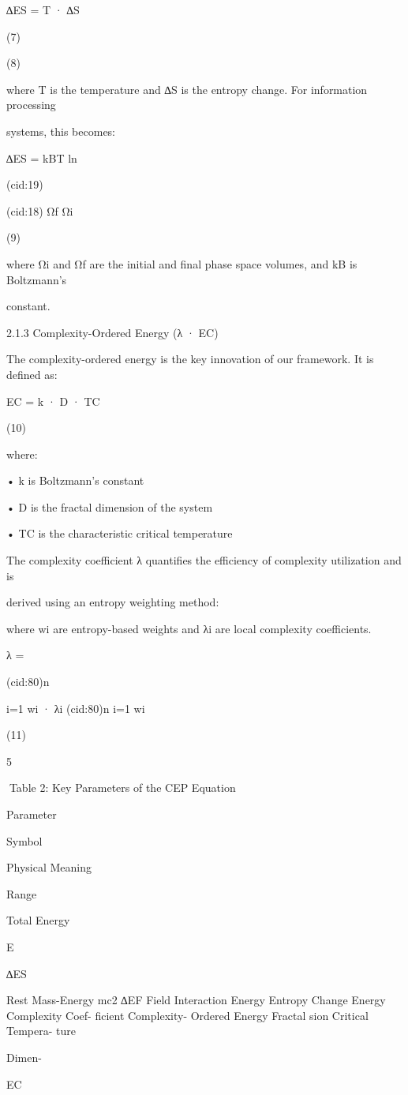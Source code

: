 ∆ES = T · ∆S

(7)

(8)

where T is the temperature and ∆S is the entropy change. For information processing

systems, this becomes:

∆ES = kBT ln

(cid:19)

(cid:18) Ωf
Ωi

(9)

where Ωi and Ωf are the initial and final phase space volumes, and kB is Boltzmann’s

constant.

2.1.3 Complexity-Ordered Energy (λ · EC)

The complexity-ordered energy is the key innovation of our framework. It is defined as:

EC = k · D · TC

(10)

where:

• k is Boltzmann’s constant

• D is the fractal dimension of the system

• TC is the characteristic critical temperature

The complexity coefficient λ quantifies the efficiency of complexity utilization and is

derived using an entropy weighting method:

where wi are entropy-based weights and λi are local complexity coefficients.

λ =

(cid:80)n

i=1 wi · λi
(cid:80)n
i=1 wi

(11)

5

Table 2: Key Parameters of the CEP Equation

Parameter

Symbol

Physical Meaning

Range

Total Energy

E

∆ES

Rest Mass-Energy mc2
∆EF
Field Interaction
Energy
Entropy Change
Energy
Complexity Coef-
ficient
Complexity-
Ordered Energy
Fractal
sion
Critical Tempera-
ture

Dimen-

EC

